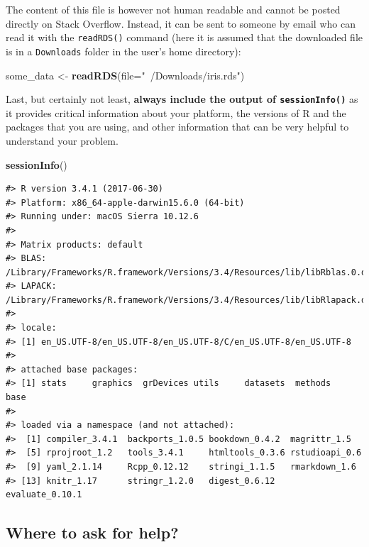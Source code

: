 \documentclass[]{book}
\newenvironment{Shaded}{\begin{snugshade}}{\end{snugshade}}
\newcommand{\KeywordTok}[1]{\textcolor[rgb]{0.13,0.29,0.53}{\textbf{{#1}}}}
\newcommand{\DataTypeTok}[1]{\textcolor[rgb]{0.13,0.29,0.53}{{#1}}}
\newcommand{\StringTok}[1]{\textcolor[rgb]{0.31,0.60,0.02}{{#1}}}
\newcommand{\NormalTok}[1]{{#1}}
\theoremstyle{definition}
\theoremstyle{definition}
\theoremstyle{remark}
\begin{document}
The content of this file is however not human readable and cannot be
posted directly on Stack Overflow. Instead, it can be sent to someone by
email who can read it with the \texttt{readRDS()} command (here it is
assumed that the downloaded file is in a \texttt{Downloads} folder in
the user's home directory):

\begin{Shaded}
\begin{Highlighting}[]
\NormalTok{some_data <-}\StringTok{ }\KeywordTok{readRDS}\NormalTok{(}\DataTypeTok{file=}\StringTok{"~/Downloads/iris.rds"}\NormalTok{)}
\end{Highlighting}
\end{Shaded}

Last, but certainly not least, \textbf{always include the output of
\texttt{sessionInfo()}} as it provides critical information about your
platform, the versions of R and the packages that you are using, and
other information that can be very helpful to understand your problem.

\begin{Shaded}
\begin{Highlighting}[]
\KeywordTok{sessionInfo}\NormalTok{()}
\end{Highlighting}
\end{Shaded}

\begin{verbatim}
#> R version 3.4.1 (2017-06-30)
#> Platform: x86_64-apple-darwin15.6.0 (64-bit)
#> Running under: macOS Sierra 10.12.6
#> 
#> Matrix products: default
#> BLAS: /Library/Frameworks/R.framework/Versions/3.4/Resources/lib/libRblas.0.dylib
#> LAPACK: /Library/Frameworks/R.framework/Versions/3.4/Resources/lib/libRlapack.dylib
#> 
#> locale:
#> [1] en_US.UTF-8/en_US.UTF-8/en_US.UTF-8/C/en_US.UTF-8/en_US.UTF-8
#> 
#> attached base packages:
#> [1] stats     graphics  grDevices utils     datasets  methods   base     
#> 
#> loaded via a namespace (and not attached):
#>  [1] compiler_3.4.1  backports_1.0.5 bookdown_0.4.2  magrittr_1.5   
#>  [5] rprojroot_1.2   tools_3.4.1     htmltools_0.3.6 rstudioapi_0.6 
#>  [9] yaml_2.1.14     Rcpp_0.12.12    stringi_1.1.5   rmarkdown_1.6  
#> [13] knitr_1.17      stringr_1.2.0   digest_0.6.12   evaluate_0.10.1
\end{verbatim}

\subsection{Where to ask for help?}\label{where-to-ask-for-help}
\end{document}
